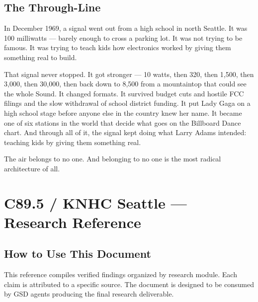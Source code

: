 \documentclass[11pt,letterpaper]{article}
\newcommand{\stageheader}[2]{%
  \noindent\colorbox{#2}{\makebox[\textwidth][l]{%
    \textcolor{white}{\bfseries\sffamily\hspace{6pt}#1\hspace{6pt}}}}%
  \vspace{0.5em}\par%
}
\begin{document}
\subsection{The Through-Line}

In December 1969, a signal went out from a high school in north Seattle. It was 100 milliwatts --- barely enough to cross a parking lot. It was not trying to be famous. It was trying to teach kids how electronics worked by giving them something real to build.

That signal never stopped. It got stronger --- 10 watts, then 320, then 1,500, then 3,000, then 30,000, then back down to 8,500 from a mountaintop that could see the whole Sound. It changed formats. It survived budget cuts and hostile FCC filings and the slow withdrawal of school district funding. It put Lady Gaga on a high school stage before anyone else in the country knew her name. It became one of six stations in the world that decide what goes on the Billboard Dance chart. And through all of it, the signal kept doing what Larry Adams intended: teaching kids by giving them something real.

The air belongs to no one. And belonging to no one is the most radical architecture of all.


\newpage
\stageheader{STAGE 2 --- RESEARCH REFERENCE}{secondary}

\section{C89.5 / KNHC Seattle --- Research Reference}

\subsection{How to Use This Document}

This reference compiles verified findings organized by research module. Each claim is attributed to a specific source. The document is designed to be consumed by GSD agents producing the final research deliverable.
\end{document}
